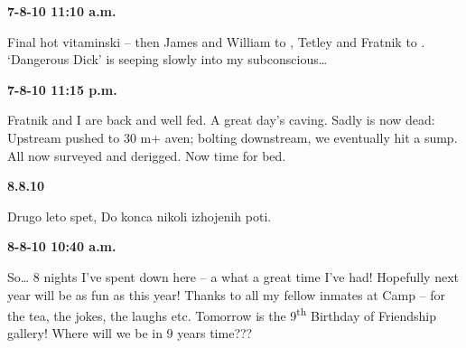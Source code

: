 \textbf{7-8-10 11:10 a.m.}


Final hot vitaminski -- then James and William to , Tetley and Fratnik to . `Dangerous Dick' is seeping slowly into my subconscious\ldots{}



\textbf{7-8-10 11:15 p.m.}

Fratnik and I are back and well fed. A great day's caving. Sadly  is now dead: Upstream pushed to 30 m+ aven; bolting downstream, we eventually hit a sump. All now surveyed and derigged. Now time for bed.


\textbf{8.8.10}

Drugo leto spet, Do konca nikoli izhojenih poti.



\textbf{8-8-10 10:40 a.m.}

So\ldots{} 8 nights I've spent down here -- a what a great time I've
had! Hopefully next year will be as fun as this year! Thanks to all my
fellow inmates at Camp  -- for the tea, the jokes, the
laughs etc. Tomorrow is the 9\textsuperscript{th} Birthday of Friendship
gallery! Where will we be in 9 years time???



